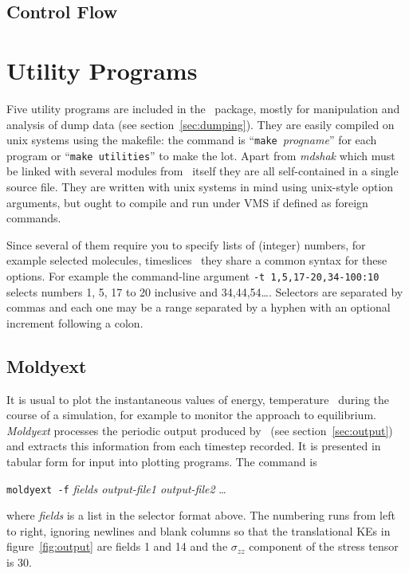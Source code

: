 \section{Control Flow}%

\chapter{Utility Programs} %
Five utility programs are included in the \moldy\ package, mostly for
manipulation and analysis of dump data (see section~\ref{sec:dumping}).
They are easily compiled on unix systems using the makefile: the
command is ``\verb'make'~{\em progname\/}'' for each program or
``\verb'make utilities''' to make the lot.  Apart from {\em mdshak\/}
which must be linked with several modules from \moldy\ itself they are
all self-contained in a single source file.  They are written with
unix systems in mind using unix-style option arguments, but ought to
compile and run under VMS if defined as foreign commands.

Since several of them require you to specify lists of (integer)
numbers, for example selected molecules, timeslices \etc\ they share a
common syntax for these options.  For example the command-line
argument \mbox{\verb'-t 1,5,17-20,34-100:10'} selects numbers 1, 5, 17 to 20
inclusive and 34,44,54\ldots.  Selectors are separated by commas and
each one may be a range separated by a hyphen with an optional
increment following a colon.

\section{Moldyext}%
It is usual to plot the instantaneous values of energy, temperature
\etc\ during the course of a simulation, for example to monitor the
approach to equilibrium.  {\em Moldyext\/} processes the periodic
output produced by \moldy\ (see section~\ref{sec:output}) and extracts
this information from each timestep recorded.  It is presented in
tabular form for input into plotting programs.  The command is
\begin{center}
\verb'moldyext -f' {\em fields output-file1 output-file2} \ldots
\end{center}
where {\em fields\/} is a list in the selector format above.  The
numbering runs from left to right, ignoring newlines and blank columns
so that the translational KEs in figure~\ref{fig:output} are fields 1
and 14 and the $\sigma_{zz}$ component of the stress tensor is 30.

